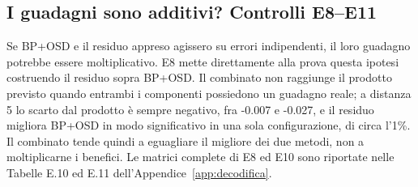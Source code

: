 \subsection{I guadagni sono additivi? Controlli E8--E11}\label{sec:finale_5_3_6}

Se BP+OSD e il residuo appreso agissero su errori indipendenti, il loro guadagno potrebbe essere moltiplicativo. E8 mette direttamente alla prova questa ipotesi costruendo il residuo sopra BP+OSD. Il combinato non raggiunge il prodotto previsto quando entrambi i componenti possiedono un guadagno reale; a distanza 5 lo scarto dal prodotto è sempre negativo, fra -0.007 e -0.027, e il residuo migliora BP+OSD in modo significativo in una sola configurazione, di circa l'1\%. Il combinato tende quindi a eguagliare il migliore dei due metodi, non a moltiplicarne i benefici. Le matrici complete di E8 ed E10 sono riportate nelle Tabelle E.10 ed E.11 dell'Appendice~\ref{app:decodifica}.


